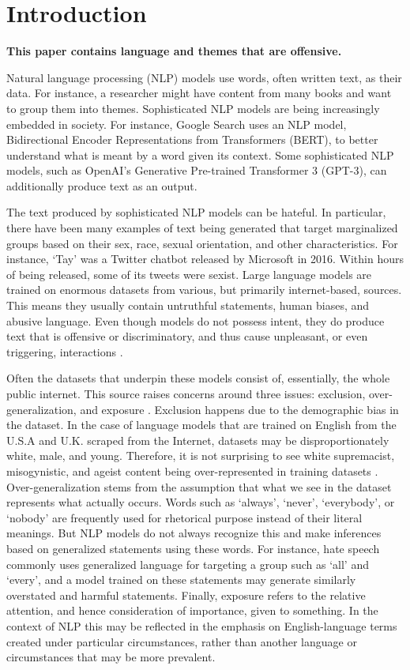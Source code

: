 \documentclass[12pt,]{article}
\begin{document}
\vskip 6.5pt


\noindent  \hypertarget{introduction}{%
\section{Introduction}\label{introduction}}

\textbf{This paper contains language and themes that are offensive.}

Natural language processing (NLP) models use words, often written text, as their data. For instance, a researcher might have content from many books and want to group them into themes. Sophisticated NLP models are being increasingly embedded in society. For instance, Google Search uses an NLP model, Bidirectional Encoder Representations from Transformers (BERT), to better understand what is meant by a word given its context. Some sophisticated NLP models, such as OpenAI's Generative Pre-trained Transformer 3 (GPT-3), can additionally produce text as an output.

The text produced by sophisticated NLP models can be hateful. In particular, there have been many examples of text being generated that target marginalized groups based on their sex, race, sexual orientation, and other characteristics. For instance, `Tay' was a Twitter chatbot released by Microsoft in 2016. Within hours of being released, some of its tweets were sexist. Large language models are trained on enormous datasets from various, but primarily internet-based, sources. This means they usually contain untruthful statements, human biases, and abusive language. Even though models do not possess intent, they do produce text that is offensive or discriminatory, and thus cause unpleasant, or even triggering, interactions \citep{bender2021dangers}.

Often the datasets that underpin these models consist of, essentially, the whole public internet. This source raises concerns around three issues: exclusion, over-generalization, and exposure \citep{hovy2016social}. Exclusion happens due to the demographic bias in the dataset. In the case of language models that are trained on English from the U.S.A and U.K. scraped from the Internet, datasets may be disproportionately white, male, and young. Therefore, it is not surprising to see white supremacist, misogynistic, and ageist content being over-represented in training datasets \citep{bender2021dangers}. Over-generalization stems from the assumption that what we see in the dataset represents what actually occurs. Words such as `always', `never', `everybody', or `nobody' are frequently used for rhetorical purpose instead of their literal meanings. But NLP models do not always recognize this and make inferences based on generalized statements using these words. For instance, hate speech commonly uses generalized language for targeting a group such as `all' and `every', and a model trained on these statements may generate similarly overstated and harmful statements. Finally, exposure refers to the relative attention, and hence consideration of importance, given to something. In the context of NLP this may be reflected in the emphasis on English-language terms created under particular circumstances, rather than another language or circumstances that may be more prevalent.
\end{document}
